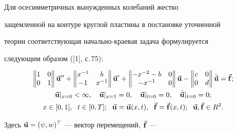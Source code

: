 \begin{exam} Для осесимметричных вынужденных колебаний жестко 


защемленной на контуре круглой пластины в постановке уточненной 


теории соответствующая начально-краевая задача формулируется 


следующим образом ([1], с.\,75): 


\begin{gather} 


\begin{Vmatrix} 


1 & 0 \\ 0 & 1 


\end{Vmatrix} 


\vb{u}''+ 


\begin{Vmatrix} 


x^{-1} & b \\ -1 & x^{-1} 


\end{Vmatrix} 


\vb{u}'+ 


\begin{Vmatrix} 


-x^{-2}-b & 0 \\ -x^{-1} & 0 


\end{Vmatrix} 


\vb{u}- 


\begin{Vmatrix} 


c & 0 \\ 0 & d 


\end{Vmatrix} 


\Ddot{\vb{u}}=\vb{f};\notag \\ 


%


\vb{u}|_{x=0}<\infty,\quad \vb{u}|_{x=1}=0,\quad \vb{u}|_{t=0}=0,\quad 


\Dot{\vb{u}}|_{t=0}=0; \\ 


x\in [0,1],\ \; t\in[0,T];\ \; \vb{u}=\vb{u}(x,t), 


\ \; \vb{f}=\vb{f}(x,t);\ \; \vb{u},\vb{f}\in R^2\notag. 


\end{gather} 


Здесь $\Vec{\bold{u}}=(\psi,w)^\top$ --- вектор перемещений, $\Vec{\bold{f}}$ --- 



\end{exam}
